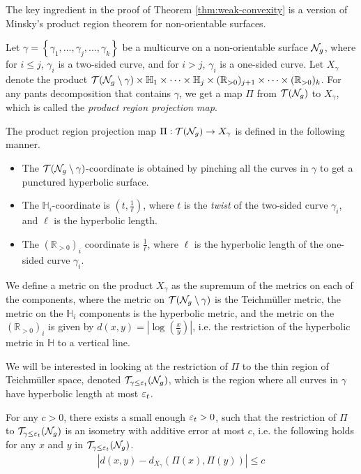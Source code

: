\documentclass[12pt, reqno]{amsart}
\begin{document}
The key ingredient in the proof of Theorem \ref{thm:weak-convexity} is a version of Minsky's product region theorem \cite[Theorem 6.1]{1077244446} for non-orientable surfaces.

Let $\gamma = \left\{ \gamma_1, \ldots, \gamma_j, \ldots, \gamma_k \right\}$ be a multicurve on a non-orientable surface $\mathcal{N}_g$, where for $i \leq j$, $\gamma_i$ is a two-sided curve, and for $i > j$, $\gamma_i$ is a one-sided curve.
Let $X_\gamma$ denote the product $\mathcal{T}(\mathcal{N}_g \setminus \gamma) \times \mathbb{H}_1 \times \cdots \times \mathbb{H}_j \times (\mathbb{R}_{>0})_{j+1} \times \cdots \times (\mathbb{R}_{>0})_k$.
For any pants decomposition that contains $\gamma$, we get a map $\Pi$ from $\mathcal{T}(\mathcal{N}_g)$ to $X_\gamma$, which is called the \emph{product region projection map}.
\begin{definition}
  The product region projection map $\Pi: \mathcal{T}(\mathcal{N}_g) \to X_\gamma$ is defined in the following manner.
  \begin{itemize}
  \item The $\mathcal{T}(\mathcal{N}_g \setminus \gamma)$-coordinate is obtained by pinching all the curves in $\gamma$ to get a punctured hyperbolic surface.
  \item The $\mathbb{H}_i$-coordinate is $\left( t, \frac{1}{\ell} \right)$, where $t$ is the \emph{twist} of the two-sided curve $\gamma_i$, and $\ell$ is the hyperbolic length.
  \item The $(\mathbb{R}_{>0})_i$ coordinate is $\frac{1}{\ell}$, where $\ell$ is the hyperbolic length of the one-sided curve $\gamma_i$.
  \end{itemize}
\end{definition}

We define a metric on the product $X_\gamma$ as the supremum of the metrics on each of the components, where the metric on $\mathcal{T}(\mathcal{N}_g \setminus \gamma)$ is the Teichmüller metric, the metric on the $\mathbb{H}_i$ components is the hyperbolic metric, and the metric on the $(\mathbb{R}_{>0})_i$ is given by $d(x,y) = \left| \log\left( \frac{x}{y}  \right) \right| $, i.e. the restriction of the hyperbolic metric in $\mathbb{H}$ to a vertical line.

We will be interested in looking at the restriction of $\Pi$ to the thin region of Teichmüller space, denoted $\mathcal{T}_{\gamma \leq \varepsilon_t}(\mathcal{N}_g)$, which is the region where all curves in $\gamma$ have hyperbolic length at most $\varepsilon_t$.

\begingroup
\def\thetheorem{\ref{thm:prno}}
\begin{theorem}
  For any $c >0$, there exists a small enough $\varepsilon_t > 0$, such that the restriction of $\Pi$ to $\mathcal{T}_{\gamma \leq \varepsilon_t}(\mathcal{N}_g)$ is an isometry with additive error at most $c$, i.e. the following holds for any $x$ and $y$ in $\mathcal{T}_{\gamma \leq \varepsilon_t}(\mathcal{N}_g)$.
  \begin{align*}
    \left| d(x, y) - d_{X_{\gamma}}(\Pi(x), \Pi(y)) \right| \leq c
  \end{align*}

\end{theorem}
\addtocounter{theorem}{-1}
\endgroup
\end{document}
